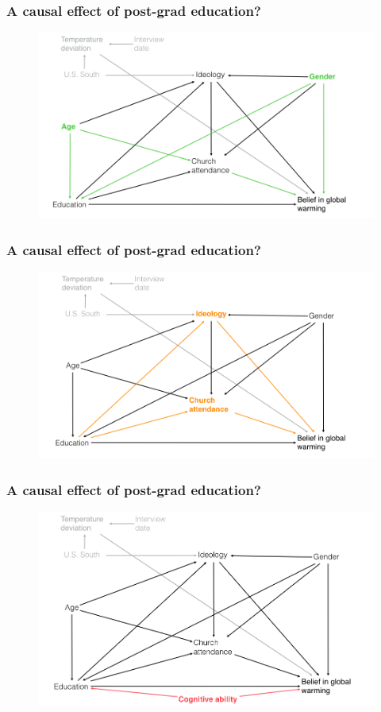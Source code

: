 \documentclass[12pt,english,dvipsnames,aspectratio=169,handout]{beamer}\usepackage[]{graphicx}\usepackage[]{xcolor}
\begin{document}
\begin{frame}
  \frametitle{A causal effect of post-grad education?}
	 \begin{figure} 
    \includegraphics[height=.8\textheight]{../04-figures/03/08-egan&mullin_observables}
    \end{figure}
\end{frame}

\begin{frame}
  \frametitle{A causal effect of post-grad education?}
	 \begin{figure} 
    \includegraphics[height=.8\textheight]{../04-figures/03/09-egan&mullin_onpath}
    \end{figure}
\end{frame}


\begin{frame}
  \frametitle{A causal effect of post-grad education?}
	 \begin{figure} 
    \includegraphics[height=.8\textheight]{../04-figures/03/10-egan&mullin_unobservables}
    \end{figure}
\end{frame}
\end{document}
